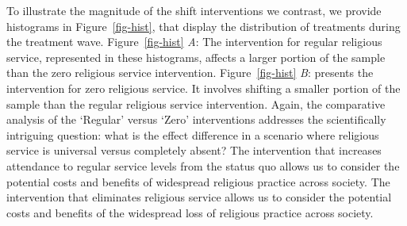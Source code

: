 \documentclass[
  single column]{article}
\begin{document}
To illustrate the magnitude of the shift interventions we contrast, we
provide histograms in Figure~\ref{fig-hist}, that display the
distribution of treatments during the treatment wave.
Figure~\ref{fig-hist} \emph{A}: The intervention for regular religious
service, represented in these histograms, affects a larger portion of
the sample than the zero religious service intervention.
Figure~\ref{fig-hist} \emph{B}: presents the intervention for zero
religious service. It involves shifting a smaller portion of the sample
than the regular religious service intervention. Again, the comparative
analysis of the `Regular' versus `Zero' interventions addresses the
scientifically intriguing question: what is the effect difference in a
scenario where religious service is universal versus completely absent?
The intervention that increases attendance to regular service levels
from the status quo allows us to consider the potential costs and
benefits of widespread religious practice across society. The
intervention that eliminates religious service allows us to consider the
potential costs and benefits of the widespread loss of religious
practice across society.
\end{document}
